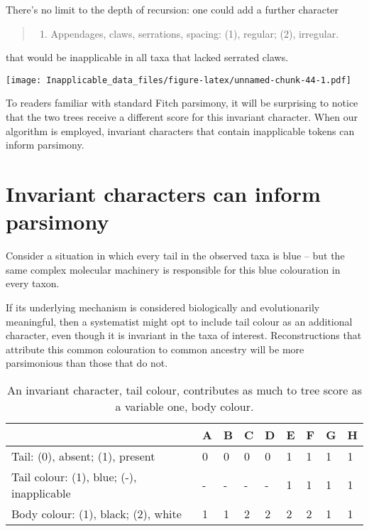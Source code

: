 \documentclass[]{book}
\providecommand{\tightlist}{%
  \setlength{\itemsep}{0pt}\setlength{\parskip}{0pt}}
\theoremstyle{definition}
\theoremstyle{definition}
\theoremstyle{definition}
\theoremstyle{remark}
\begin{document}
There's no limit to the depth of recursion: one could add a further
character

\begin{quote}
\begin{enumerate}
\def\labelenumi{\arabic{enumi}.}
\setcounter{enumi}{4}
\tightlist
\item
  Appendages, claws, serrations, spacing: (1), regular; (2), irregular.
\end{enumerate}
\end{quote}

that would be inapplicable in all taxa that lacked serrated claws.

\texttt{[image: Inapplicable\_data\_files/figure-latex/unnamed-chunk-44-1.pdf]}

To readers familiar with standard Fitch parsimony, it will be surprising
to notice that the two trees receive a different score for this
invariant character. When our algorithm is employed, invariant
characters that contain inapplicable tokens can inform parsimony.

\hypertarget{invariant-characters-can-inform-parsimony}{%
\section{Invariant characters can inform
parsimony}\label{invariant-characters-can-inform-parsimony}}

Consider a situation in which every tail in the observed taxa is blue --
but the same complex molecular machinery is responsible for this blue
colouration in every taxon.

If its underlying mechanism is considered biologically and
evolutionarily meaningful, then a systematist might opt to include tail
colour as an additional character, even though it is invariant in the
taxa of interest. Reconstructions that attribute this common colouration
to common ancestry will be more parsimonious than those that do not.

\begin{table}

\caption{\label{tab:unnamed-chunk-45}An invariant character, tail colour, contributes as much to tree score as a variable one, body colour.}
\centering
\begin{tabular}[t]{l|l|l|l|l|l|l|l|l}
\hline
  & A & B & C & D & E & F & G & H\\
\hline
Tail: (0), absent; (1), present & 0 & 0 & 0 & 0 & 1 & 1 & 1 & 1\\
\hline
Tail colour: (1), blue; (-), inapplicable & - & - & - & - & 1 & 1 & 1 & 1\\
\hline
Body colour: (1), black; (2), white & 1 & 1 & 2 & 2 & 2 & 2 & 1 & 1\\
\hline
\end{tabular}
\end{table}
\end{document}
